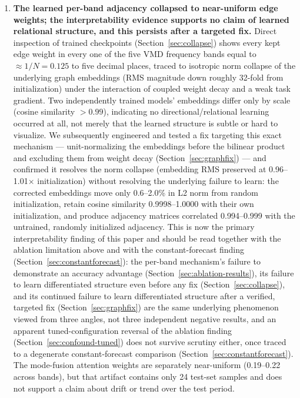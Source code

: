 \documentclass[journal]{IEEEtran}
\begin{document}
\begin{enumerate}
    \item \textbf{The learned per-band adjacency collapsed to near-uniform edge weights; the interpretability evidence supports no claim of learned relational structure, and this persists after a targeted fix.} Direct inspection of trained checkpoints (Section~\ref{sec:collapse}) shows every kept edge weight in every one of the five VMD frequency bands equal to $\approx 1/N=0.125$ to five decimal places, traced to isotropic norm collapse of the underlying graph embeddings (RMS magnitude down roughly 32-fold from initialization) under the interaction of coupled weight decay and a weak task gradient. Two independently trained models' embeddings differ only by scale (cosine similarity $>0.99$), indicating no directional/relational learning occurred at all, not merely that the learned structure is subtle or hard to visualize. We subsequently engineered and tested a fix targeting this exact mechanism --- unit-normalizing the embeddings before the bilinear product and excluding them from weight decay (Section~\ref{sec:graphfix}) --- and confirmed it resolves the norm collapse (embedding RMS preserved at 0.96--1.01$\times$ initialization) without resolving the underlying failure to learn: the corrected embeddings move only 0.6--2.0\% in L2 norm from random initialization, retain cosine similarity 0.9998--1.0000 with their own initialization, and produce adjacency matrices correlated 0.994--0.999 with the untrained, randomly initialized adjacency. This is now the primary interpretability finding of this paper and should be read together with the ablation limitation above and with the constant-forecast finding (Section~\ref{sec:constantforecast}): the per-band mechanism's failure to demonstrate an accuracy advantage (Section~\ref{sec:ablation-results}), its failure to learn differentiated structure even before any fix (Section~\ref{sec:collapse}), and its continued failure to learn differentiated structure after a verified, targeted fix (Section~\ref{sec:graphfix}) are the same underlying phenomenon viewed from three angles, not three independent negative results, and an apparent tuned-configuration reversal of the ablation finding (Section~\ref{sec:confound-tuned}) does not survive scrutiny either, once traced to a degenerate constant-forecast comparison (Section~\ref{sec:constantforecast}). The mode-fusion attention weights are separately near-uniform (0.19--0.22 across bands), but that artifact contains only 24 test-set samples and does not support a claim about drift or trend over the test period.

\end{enumerate}
\end{document}
